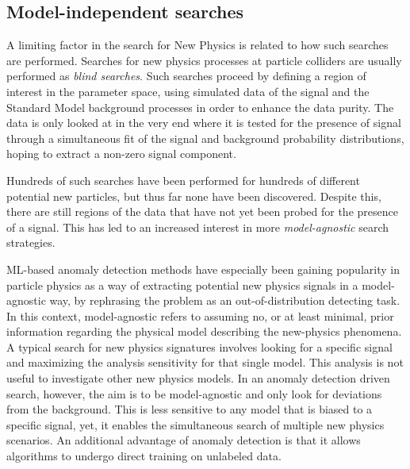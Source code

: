 \documentclass[12pt]{iopart}
\begin{document}
\subsection{Model-independent searches}
 A limiting factor in the search for New Physics is related to how such searches are performed. Searches for new physics processes at particle colliders are usually performed as \textit{blind searches}. Such searches proceed by defining a region of interest in the parameter space, using simulated data of the signal and the Standard Model background processes in order to enhance the data purity. The data is only looked at in the very end where it is tested for the presence of signal through a simultaneous fit of the signal and background probability distributions, hoping to extract a non-zero signal component.

Hundreds of such searches have been performed for hundreds of different potential new particles, but thus far none have been discovered. Despite this, there are still regions of the data that have not yet been probed for the presence of a signal. This has led to an increased interest in more \textit{model-agnostic} search strategies.

ML-based anomaly detection methods have especially been gaining popularity in particle physics as a way of extracting potential new physics signals in a model-agnostic way, by rephrasing the problem as an out-of-distribution detecting task. In this context, model-agnostic refers to assuming no, or at least minimal, prior information regarding the physical model describing the new-physics phenomena. A typical search for new physics signatures involves looking for a specific signal and maximizing the analysis sensitivity for that single model. This analysis is not useful to investigate other new physics models. In an anomaly detection driven search, however, the aim is to be model-agnostic and only look for deviations from the background. This is less sensitive to any model that is biased to a specific signal, yet, it enables the simultaneous search of multiple new physics scenarios. An additional advantage of anomaly detection is that it allows algorithms to undergo direct training on unlabeled data.
\end{document}
